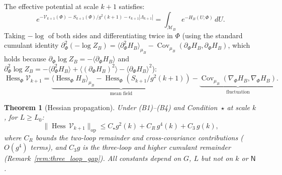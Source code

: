 \documentclass[11pt,a4paper]{article}
\theoremstyle{plain}
\newtheorem{theorem}{Theorem}[section]
\theoremstyle{definition}
\theoremstyle{remark}
\newcommand{\Cov}{\operatorname{Cov}}
\newcommand{\Hess}{\operatorname{Hess}}
\newcommand{\cM}{\mathcal{M}}
\newcommand{\cV}{\mathcal{V}}
\begin{document}
The effective potential at scale $k+1$ satisfies:
\begin{equation}\label{eq:Vk1_def}
  e^{-\cV_{k+1}(\Phi) - S_{k+1}(\Phi)/g^2(k+1)
  - \epsilon_{k+1}|\Lambda_{k+1}|}
  = \int_{\cM_B} e^{-H_B(U;\Phi)}\,dU.
\end{equation}
Taking $-\log$ of both sides and differentiating twice
in $\Phi$ (using the standard cumulant identity
$\partial^2_\Phi(-\log Z_B) = \langle\partial^2_\Phi H_B
\rangle_{\mu_B} - \Cov_{\mu_B}(\partial_\Phi H_B,
\partial_\Phi H_B)$, which holds because
$\partial_\Phi \log Z_B = -\langle\partial_\Phi H_B\rangle$
and $\partial^2_\Phi \log Z_B = -\langle\partial^2_\Phi H_B
\rangle + \langle(\partial_\Phi H_B)^2\rangle
- \langle\partial_\Phi H_B\rangle^2$):
\begin{equation}\label{eq:hess_formula}
  \Hess_\Phi \cV_{k+1}
  = \underbrace{\langle \Hess_\Phi H_B \rangle_{\mu_B}
  - \Hess_\Phi(S_{k+1}/g^2(k+1))}_{\text{mean field}}
  - \underbrace{\Cov_{\mu_B}(\nabla_\Phi H_B,
  \nabla_\Phi H_B)}_{\text{fluctuation}}.
\end{equation}

\begin{theorem}[Hessian propagation]\label{thm:hess_prop}
Under (B1)--(B4) and Condition~$\star$ at scale $k$,
for $L \ge L_0$:
\begin{equation}\label{eq:propagation}
  \|\Hess\,\cV_{k+1}\|_{\mathrm{op}}
  \le C_\star g^2(k) + C_R\,g^4(k) + C_3\,g(k),
\end{equation}
where $C_R$ bounds the two-loop remainder and
cross-covariance contributions ($O(g^4)$ terms),
and $C_3 g$ is the three-loop and higher cumulant
remainder (Remark~\ref{rem:three_loop_gap}).
All constants depend on $G$, $L$ but not on $k$
or $\mathsf{N}$.
\end{theorem}
\end{document}
